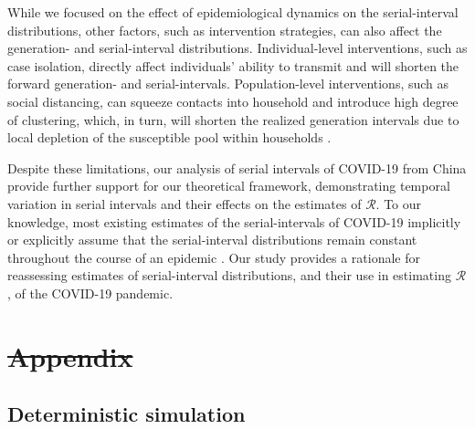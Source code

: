 \documentclass[12pt]{article}
\newcommand{\RR}{\ensuremath{{\mathcal R}}\xspace}
\providecommand{\DIFaddtex}[1]{{\protect\color{blue}\uwave{#1}}} %
\providecommand{\DIFdeltex}[1]{{\protect\color{red}\sout{#1}}}                      %
\providecommand{\DIFaddbegin}{} %
\providecommand{\DIFaddend}{} %
\providecommand{\DIFdelbegin}{} %
\providecommand{\DIFdelend}{} %
\providecommand{\DIFadd}[1]{\texorpdfstring{\DIFaddtex{#1}}{#1}} %
\providecommand{\DIFdel}[1]{\texorpdfstring{\DIFdeltex{#1}}{}} %
\newcommand{\DIFscaledelfig}{0.5}
\newlength{\DIFdelgraphicswidth} %
\newlength{\DIFdelgraphicsheight} %
\newcommand{\DIFaddincludegraphics}[2][]{{\color{blue}\fbox{\DIFOincludegraphics[#1]{#2}}}} %
\newcommand{\DIFdelincludegraphics}[2][]{%
\sbox{\DIFdelgraphicsbox}{\DIFOincludegraphics[#1]{#2}}%
\settoboxwidth{\DIFdelgraphicswidth}{\DIFdelgraphicsbox} %
\settoboxtotalheight{\DIFdelgraphicsheight}{\DIFdelgraphicsbox} %
\scalebox{\DIFscaledelfig}{%
\parbox[b]{\DIFdelgraphicswidth}{\usebox{\DIFdelgraphicsbox}\\[-\baselineskip] \rule{\DIFdelgraphicswidth}{0em}}\llap{\resizebox{\DIFdelgraphicswidth}{\DIFdelgraphicsheight}{%
\setlength{\unitlength}{\DIFdelgraphicswidth}%
\begin{picture}(1,1)%
\thicklines\linethickness{2pt} %
{\color[rgb]{1,0,0}\put(0,0){\framebox(1,1){}}}%
{\color[rgb]{1,0,0}\put(0,0){\line( 1,1){1}}}%
{\color[rgb]{1,0,0}\put(0,1){\line(1,-1){1}}}%
\end{picture}%
}\hspace*{3pt}}} %
} %
\DeclareRobustCommand{\DIFaddbegin}{\DIFOaddbegin \let\includegraphics\DIFaddincludegraphics} %
\DeclareRobustCommand{\DIFaddend}{\DIFOaddend \let\includegraphics\DIFOincludegraphics} %
\DeclareRobustCommand{\DIFdelbegin}{\DIFOdelbegin \let\includegraphics\DIFdelincludegraphics} %
\DeclareRobustCommand{\DIFdelend}{\DIFOaddend \let\includegraphics\DIFOincludegraphics} %
\begin{document}
While we focused on the effect of epidemiological dynamics on the serial-interval distributions, other factors, such as intervention strategies, can also affect the generation- and serial-interval distributions.
Individual-level interventions, such as case isolation, directly affect individuals' ability to transmit and will shorten the forward generation- and serial-intervals.
Population-level interventions, such as social distancing, can squeeze contacts into household and introduce high degree of clustering, which, in turn, will shorten the realized generation intervals due to local depletion of the susceptible pool within households \citep{park2019inferring}.

Despite these limitations, our analysis of serial intervals of COVID-19 from China provide further support for our theoretical framework, demonstrating temporal variation in serial intervals and their effects on the estimates of \RR.
To our knowledge, most existing estimates of the serial-intervals of COVID-19 implicitly or explicitly assume that the serial-interval distributions remain constant throughout the course of an epidemic \citep{du2020serial, he2020temporal, nishiura2020serial,tindale2020transmission,zhao2020estimating,zhang2020evolving}.
Our study provides a rationale for reassessing estimates of serial-interval distributions, and their use in estimating \RR, of the COVID-19 pandemic.

\pagebreak

\section{\DIFdelbegin \DIFdel{Appendix}\DIFdelend \DIFaddbegin \DIFadd{Supplementary Materials}\DIFaddend }

\subsection{Deterministic simulation}
\end{document}
